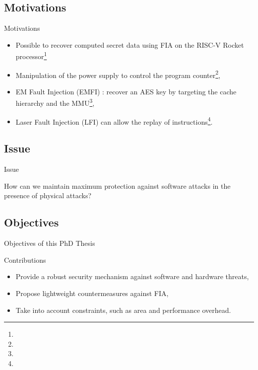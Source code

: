 \subsection{Motivations}
\begin{frame}{Motivations}
    \begin{block}{}
        \begin{itemize}
            \item Possible to recover computed secret data using FIA on the RISC-V Rocket processor\footnote[frame]{\tiny{}}
            \item Manipulation of the power supply to control the program counter\footnote[frame]{\tiny{}},
            \item EM Fault Injection (EMFI) : recover an AES key by targeting the cache hierarchy and the MMU\footnote[frame]{\tiny{}},
            \item Laser Fault Injection (LFI) can allow the replay of instructions\footnote[frame]{\tiny{}}.
        \end{itemize}
    \end{block}
\end{frame}
\subsection{Issue}
\begin{frame}{Issue}
    \begin{exampleblock}{}
        How can we maintain maximum protection against software attacks in the presence of physical attacks?
    \end{exampleblock}
\end{frame}
\subsection{Objectives}
\begin{frame}{Objectives of this PhD Thesis}
    \begin{block}{Contributions}
        \begin{itemize}
            [triangle]
            \justifying
            \item Provide a robust security mechanism against software and hardware threats,
            \item Propose lightweight countermeasures against FIA,
            \item Take into account constraints, such as area and performance overhead.
        \end{itemize}
    \end{block}
\end{frame}
